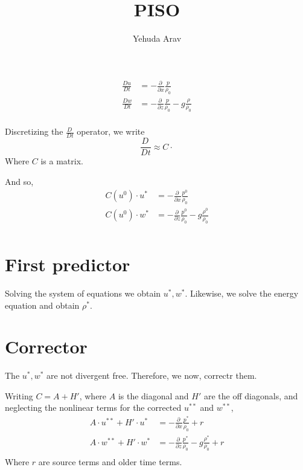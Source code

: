 \documentclass[a4paper,10pt]{article}
\title{PISO}
\author{Yehuda Arav}
\newcommand{\pd}[2]{\frac{\partial #1}{\partial #2}}
\newcommand{\DT}[1]{\frac{D #1}{Dt}}
\begin{document}
\maketitle

\begin{equation}
  \begin{align}
    \DT{u} &= -\pd{\,}{x}\frac{p}{\rho_0} \\
    \DT{w} &= -\pd{\,}{z}\frac{p}{\rho_0} - g\frac{\rho}{\rho_0}\\
  \end{align}
\end{equation}

Discretizing the $\DT{\,}$ operator, we write
\begin{equation}
  \DT{\,} \approx C\cdot 
\end{equation}
Where $C$ is a matrix. 

And so, 
\begin{equation}
  \begin{align}
    C(u^0)\cdot u^* &= -\pd{\,}{x}\frac{p^0}{\rho_0} \\
    C(u^0)\cdot w^* &= -\pd{\,}{z}\frac{p^0}{\rho_0} - g\frac{\rho^0}{\rho_0}\\
  \end{align} 
\end{equation}

\section{First predictor}

Solving the system of equations we obtain $u^*,w^*$. Likewise, 
we solve the energy equation and obtain $\rho^*$. 

\section{Corrector}

The $u^*,w^*$ are not divergent free. Therefore, we now, 
correctr them. 

Writing $C = A + H'$, where $A$ is the diagonal and $H'$ are the off diagonals, 
and neglecting the nonlinear terms for the corrected $u^{**}$ and $w^{**}$, 
\begin{equation}
  \begin{align}
    A\cdot u^{**} + H'\cdot u^{*} &= -\pd{\,}{x}\frac{p^*}{\rho_0}  + r\\
    A\cdot w^{**} + H'\cdot w^{*} &= -\pd{\,}{z}\frac{p^*}{\rho_0} - g\frac{\rho^*}{\rho_0} +r \\
  \end{align} 
\end{equation}
Where $r$ are source terms and older time terms. 
\end{document}
